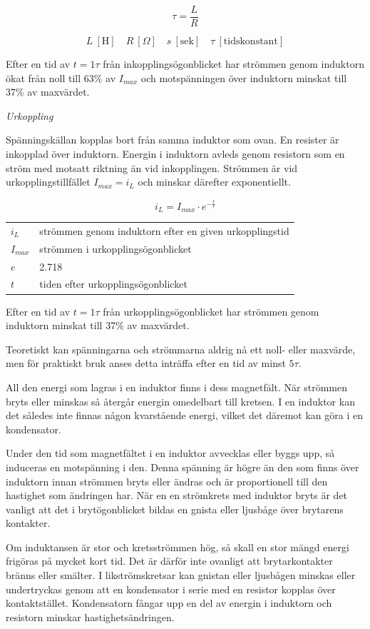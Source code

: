 \[\tau = \frac{L}{R}\]

\[
L\ [\text{H}] \quad
R\ [Ω] \quad
s\ [\text{sek}] \quad
\tau\ [\text{tidskonstant}]
\]

Efter en tid av \(t = 1\tau\) från inkopplingsögonblicket har strömmen genom
induktorn ökat från noll till 63\% av \(I_{max}\) och motspänningen över
induktorn minskat till 37\% av maxvärdet.

\emph{Urkoppling}

Spänningskällan kopplas bort från samma induktor som ovan. En resister är
inkopplad över induktorn. Energin i induktorn avleds genom resistorn som en
ström med motsatt riktning än vid inkopplingen. Strömmen är vid
urkopplingstillfället \(I_{max} = i_L\) och minskar därefter exponentiellt.

\[i_L = I_{max} \cdot e^{-\frac{t}{\tau}}\]

\begin{tabular}{ll}
  \(i_L\) & strömmen genom induktorn efter en given urkopplingstid \\
  \(I_{max}\) & strömmen i urkopplingsögonblicket \\
  \(e\) & 2.718 \\
  \(t\) & tiden efter urkopplingsögonblicket \\
\end{tabular}

Efter en tid av \(t = 1\tau\) från urkopplingsögonblicket har strömmen genom
induktorn minskat till 37\% av maxvärdet.

Teoretiskt kan spänningarna och strömmarna aldrig nå ett noll- eller maxvärde,
men för praktiskt bruk anses detta inträffa efter en tid av minst \(5\tau\).

All den energi som lagras i en induktor finns i dess magnetfält. När strömmen
bryts eller minskas så återgår energin omedelbart till kretsen. I en induktor
kan det således inte finnas någon kvarstående energi, vilket det däremot kan
göra i en kondensator.

Under den tid som magnetfältet i en induktor avvecklas eller byggs upp, så
induceras en motspänning i den. Denna spänning är högre än den som finns över
induktorn innan strömmen bryts eller ändras och är proportionell till den
hastighet som ändringen har. När en en strömkrets med induktor
bryts är det vanligt att det i brytögonblicket bildas en gnista eller ljusbåge
över brytarens kontakter.

Om induktansen är stor och kretsströmmen hög, så skall en stor mängd energi
frigöras på mycket kort tid. Det är därför inte ovanligt att brytarkontakter
bränns eller smälter. I likströmskretsar kan gnistan eller ljusbågen minskas
eller undertryckas genom att en kondensator i serie med en resistor kopplas
över kontaktstället. Kondensatorn fångar upp en del av energin i induktorn och
resistorn minskar hastighetsändringen.


